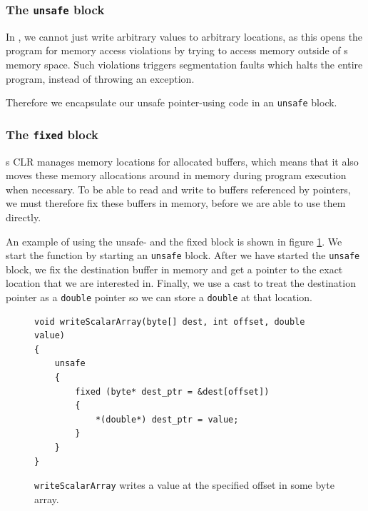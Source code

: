 \subsubsection{The \texttt{unsafe} block}
In \csharp{}, we cannot just write arbitrary values to arbitrary locations, as this
opens the program for memory access violations by trying to access memory
outside of \csharp{}s memory space. Such violations triggers segmentation faults
which halts the entire program, instead of throwing an exception.

Therefore we encapsulate our unsafe pointer-using code in an \texttt{unsafe}
block.

\subsubsection{The \texttt{fixed} block}
\csharp{}s CLR manages memory locations for allocated buffers, which means that
it also moves these memory allocations around in memory during program execution
when necessary.
To be able to read and write to buffers referenced by pointers, we must
therefore fix these buffers in memory, before we are able to use them directly.

An example of using the unsafe- and the fixed block is shown in figure
\ref{fig:writeScalarArray'}. We start the function by starting an
\texttt{unsafe} block. After we have started the \texttt{unsafe} block, we fix
the destination buffer in memory and get a pointer to the exact location that we
are interested in. Finally, we use a cast to treat the destination pointer as a
\texttt{double} pointer so we can store a \texttt{double} at that location.
\begin{figure}[h]
\centering
\begin{verbatim}
void writeScalarArray(byte[] dest, int offset, double value)
{
    unsafe
    {
        fixed (byte* dest_ptr = &dest[offset])
        {
            *(double*) dest_ptr = value;
        }
    }
}
\end{verbatim}
\caption{\texttt{writeScalarArray} writes a value at the specified offset in
some byte array.}
\label{fig:writeScalarArray'}
\end{figure}

